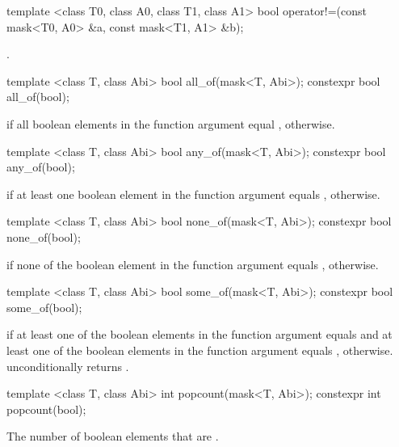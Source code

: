 \begin{itemdecl}
template <class T0, class A0, class T1, class A1>
bool operator!=(const mask<T0, A0> &a, const mask<T1, A1> &b);
\end{itemdecl}
\begin{itemdescr}
  \maskCompareRemark
  \pnum\returns {}.
\end{itemdescr}

\begin{itemdecl}
template <class T, class Abi> bool  all_of(mask<T, Abi>);
constexpr bool  all_of(bool);
\end{itemdecl}
\begin{itemdescr}
  \pnum\returns \true if all boolean elements in the function argument equal \true, \false otherwise.
\end{itemdescr}

\begin{itemdecl}
template <class T, class Abi> bool  any_of(mask<T, Abi>);
constexpr bool  any_of(bool);
\end{itemdecl}
\begin{itemdescr}
  \pnum\returns \true if at least one boolean element in the function argument equals \true, \false otherwise.
\end{itemdescr}

\begin{itemdecl}
template <class T, class Abi> bool none_of(mask<T, Abi>);
constexpr bool none_of(bool);
\end{itemdecl}
\begin{itemdescr}
  \pnum\returns \true if none of the boolean element in the function argument equals \true, \false otherwise.
\end{itemdescr}

\begin{itemdecl}
template <class T, class Abi> bool some_of(mask<T, Abi>);
constexpr bool some_of(bool);
\end{itemdecl}
\begin{itemdescr}
  \pnum\returns \true if at least one of the boolean elements in the function argument equals \true and at least one of the boolean elements in the function argument equals \false, \false otherwise.
  \pnum\realnote {} unconditionally returns \false.
\end{itemdescr}

\begin{itemdecl}
template <class T, class Abi> int popcount(mask<T, Abi>);
constexpr int popcount(bool);
\end{itemdecl}
\begin{itemdescr}
  \pnum\returns The number of boolean elements that are \true.
\end{itemdescr}


